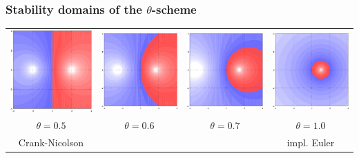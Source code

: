 \documentclass[ignorenonframetext,notheorems,aspectratio=1610]{beamer}
\begin{document}
\begin{frame}
  \frametitle{Stability domains of the $\theta$-scheme}
  \begin{center}
    \begin{tabular}{cccc}
      \includegraphics[width=.22\textwidth]{fig/stability-CR}
      &
      \includegraphics[width=.22\textwidth]{fig/stability-theta6}
      &
      \includegraphics[width=.22\textwidth]{fig/stability-theta7}
      &
      \includegraphics[width=.22\textwidth]{fig/stability-euler2}
      \\
      $\theta= 0.5$
      & $\theta = 0.6$
      & $\theta = 0.7$
      & $\theta = 1.0$
      \\
      Crank-Nicolson &&& impl. Euler
    \end{tabular}
  \end{center}
\end{frame}

\frame{}
\frame{}
\frame{}
\frame{%

}
\end{document}
